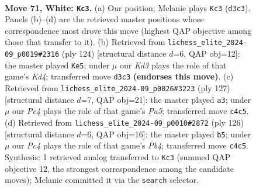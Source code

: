 \documentclass[11pt]{article}
\begin{document}
\clearpage

\begin{figure}[p]\centering
\begin{subfigure}{0.46\textwidth}\centering
\resizebox{\linewidth}{!}{%
\newchessgame
\chessboard[
  setfen={8/8/pp6/8/q1P5/3K4/7k/8 w - - 10 71},
  showmover=false,
  pgfstyle=straightmove, color=movearrow, markmove={d3-c3}
]}
\caption{}
\end{subfigure}\hfill
\begin{subfigure}{0.46\textwidth}\centering
\resizebox{\linewidth}{!}{%
\newchessgame
\chessboard[
  setfen={6k1/5p2/2q4p/2P5/3K4/8/8/8 w - - 1 63},
  showmover=false,
  pgfstyle=straightmove, color=movearrow, markmove={d4-e5}
]}
\caption{}
\end{subfigure}
\\[4pt]
\begin{subfigure}{0.46\textwidth}\centering
\resizebox{\linewidth}{!}{%
\newchessgame
\chessboard[
  setfen={3k4/6P1/2Q2P2/8/p7/8/P6K/8 b - - 0 64},
  showmover=false,
  pgfstyle=straightmove, color=movearrow, markmove={a4-a3}
]}
\caption{}
\end{subfigure}\hfill
\begin{subfigure}{0.46\textwidth}\centering
\resizebox{\linewidth}{!}{%
\newchessgame
\chessboard[
  setfen={8/1q4pk/8/5p2/KP6/8/8/8 w - - 0 64},
  showmover=false,
  pgfstyle=straightmove, color=movearrow, markmove={b4-b5}
]}
\caption{}
\end{subfigure}
\caption{\textbf{Move 71, White: \texttt{Kc3}.} (a) Our position; Melanie plays \texttt{Kc3} (\texttt{d3c3}). Panels (b)--(d) are the retrieved master positions whose correspondence most drove this move (highest QAP objective among those that transfer to it). (b) Retrieved from \texttt{lichess\_elite\_2024-09\_p0019\#2316} (ply 124) [structural distance $d$=6, QAP obj=12]: the master played \texttt{Ke5}; under $\mu$ our \emph{Kd3} plays the role of that game's \emph{Kd4}; transferred move \texttt{d3c3} \textbf{(endorses this move)}. (c) Retrieved from \texttt{lichess\_elite\_2024-09\_p0026\#3223} (ply 127) [structural distance $d$=7, QAP obj=21]: the master played \texttt{a3}; under $\mu$ our \emph{Pc4} plays the role of that game's \emph{Pa5}; transferred move \texttt{c4c5}. (d) Retrieved from \texttt{lichess\_elite\_2024-09\_p0010\#2872} (ply 126) [structural distance $d$=6, QAP obj=16]: the master played \texttt{b5}; under $\mu$ our \emph{Pc4} plays the role of that game's \emph{Pb4}; transferred move \texttt{c4c5}. Synthesis: 1 retrieved analog transferred to \texttt{Kc3} (summed QAP objective 12, the strongest correspondence among the candidate moves); Melanie committed it via the \texttt{search} selector.}
\label{fig:thought-m140}
\end{figure}
\end{document}
